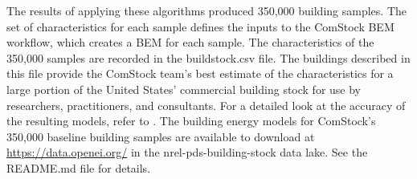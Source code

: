 The results of applying these algorithms produced 350,000 building samples. The set of characteristics for each sample defines the inputs to the ComStock BEM workflow, which creates a BEM for each sample. The characteristics of the 350,000 samples are recorded in the buildstock.csv file. The buildings described in this file provide the ComStock team's best estimate of the characteristics for a large portion of the United States' commercial building stock for use by researchers, practitioners, and consultants. For a detailed look at the accuracy of the resulting models, refer to \cite{eulp_final_report}. The building energy models for ComStock's 350,000 baseline building samples are available to download at \url{https://data.openei.org/} in the nrel-pds-building-stock data lake. See the README.md file for details.
